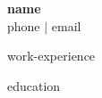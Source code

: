 \documentclass[letterpaper,12pt]{article}
\newcommand{\resumeHeader}[3]{
    \begin{center} 
    \Large{\textbf{#1}}\\
    #2 %
    $|$ #3 %
    \end{center}
    \vspace{-8pt}
}
\begin{document}

\resumeHeader{{{name}}}{{{phone}}}{{{email}}}

{{work-experience}}

{{education}}
\end{document}
